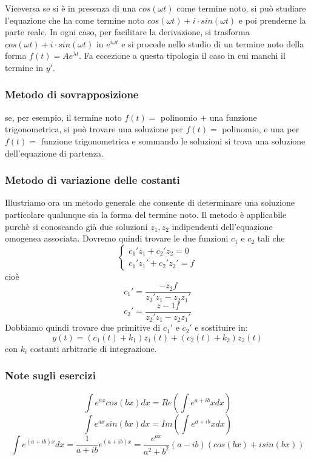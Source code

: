 \begin{itemize}
    Viceversa se si è in presenza di una $cos(\omega t)$ come termine noto, si può studiare l'equazione che ha come termine noto $cos(\omega t) + i \cdot sin(\omega t)$ e poi prenderne la parte reale.\newline
    In ogni caso, per facilitare la derivazione, si trasforma $cos(\omega t) + i \cdot sin(\omega t)$ in $e^{i\omega t}$ e si procede nello studio di un termine noto della forma $f(t) = Ae^{\lambda t}$.
    Fa eccezione a questa tipologia il caso in cui manchi il termine in $y'$.\newline
    \newline
\end{itemize}
\subsubsection{Metodo di sovrapposizione}
se, per esempio, il termine noto $f(t) =$ polinomio $+$ una funzione trigonometrica, si può trovare una soluzione per $f(t) =$ polinomio, e una per $f(t) =$ funzione trigonometrica e sommando le soluzioni si trova una soluzione dell'equazione di partenza.
\subsubsection{Metodo di variazione delle costanti}
Illustriamo ora un metodo generale che consente di determinare una soluzione particolare qualunque sia la forma del termine noto.\newline
Il metodo è applicabile purchè si conoscando già due soluzioni $z_1, z_2$ indipendenti dell'equazione omogenea associata.\newline
Dovremo quindi trovare le due funzioni $c_1$ e $c_2$ tali che
\[
    \begin{cases}
        c_1'z_1 + c_2'z_2 = 0 \\
        c_1'z_1' + c_2' z_2' = f
    \end{cases}
\]
cioè
\[
    c_1' = \frac{-z_2 f}{z_2'z_1 - z_2 z_1'}
\]
\[
    c_2' = \frac{z-1 f}{z_2'z_1 - z_2 z_1'}
\]
Dobbiamo quindi trovare due primitive di $c_1'$ e $c_2'$ e sostituire in:
\[
    y(t) =(c_1(t)+ k_1)z_1(t) + (c_2(t)+k_2)z_2(t)
\]
con $k_i$ costanti arbitrarie di integrazione.
\subsubsection{Note sugli esercizi}
\[
    \int e^{ax}cos(bx) dx = Re (\int e^{a+ib}x dx ) 
\]
\[
    \int e^{ax}sin(bx) dx = Im (\int e^{a+ib}x dx ) 
\]
\[
    \int e^{(a+ib)x} dx = \frac{1}{a+ib}e^{(a+ib)x} = \frac{e^{ax}}{a^2+b^2} (a-ib)(cos(bx) + i sin(bx))
\]
